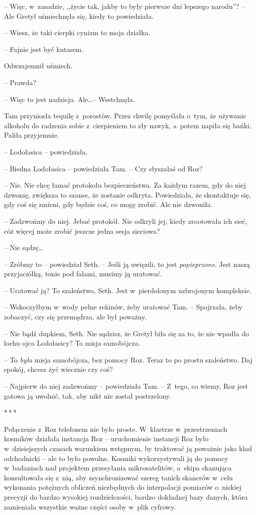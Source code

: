 \documentclass[oneside,polish,11pt,sfheadings]{mwbk}
\newcommand{\threeast}{\bigskip\par\centerline{*\,*\,*}\medskip\par}
\begin{document}
-- Więc, w~zasadzie, ,,życie tak, jakby to były pierwsze dni lepszego
narodu''? -- Ale Gretyl uśmiechnęła się, kiedy to powiedziała.

-- Wiesz, że taki cierpki cynizm to moja działka.

-- Fajnie jest być kutasem.

Odwzajemnił uśmiech. 

-- Prawda?

-- Więc to jest nadzieja. Ale\ldots  -- Westchnęła.

Tam przyniosła tequilę z~porostów. Przez chwilę pomyślała o~tym, że
używanie alkoholu do radzenia sobie z~cierpieniem to zły nawyk, a~potem
napiła się bańki. Paliła przyjemnie.

-- Lodołasica -- powiedziała.

-- Biedna Lodołasica -- powiedziała Tam. -- Czy słyszałaś od Roz?

-- Nie. Nie chcę łamać protokołu bezpieczeństwa. Za każdym razem, gdy do
niej dzwonię, zwiększa to szanse, że zostanie odkryta. Powiedziała, że
skontaktuje się, gdy coś się zmieni, gdy będzie coś, co mogę zrobić. Ale
nie dzwoniła.

-- Zadzwońmy do niej. Jebać protokół. Nie odkryli jej, kiedy zrootowała
ich sieć, cóż więcej może zrobić jeszcze jedna sesja sieciowa?

-- Nie sądzę\ldots 

-- Zróbmy to -- powiedział Seth. -- Jeśli ją uwięzili, to jest
\textit{popieprzone}. Jest naszą przyjaciółką, tonie pod falami, musimy ją
uratować.

-- Uratować ją? To szaleństwo, Seth. Jest w~pierdolonym uzbrojonym
kompleksie.

-- Wskoczyłbym w~wody pełne rekinów, żeby uratować Tam. -- Spojrzała, żeby
zobaczyć, czy się przemądrza, ale był poważny.

-- Nie bądź dupkiem, Seth. Nie sądzisz, że Gretyl biła się za to, że nie
wpadła do lochu ojca Lodołasicy? To misja samobójcza.

-- To \textit{była} misja samobójcza, bez pomocy Roz. Teraz to po prostu
szaleństwo. Daj spokój, chcesz żyć wiecznie czy coś?

-- Najpierw do niej zadzwońmy -- powiedziała Tam. -- Z~tego, co wiemy, Roz
jest gotowa ją uwolnić, tak, aby nikt nie został postrzelony.

\threeast

Połączenie z~Roz telefonem nie było proste. W~klastrze w~przestrzeniach
kosmików działała instancja Roz -- uruchomienie instancji Roz było w~dzisiejszych czasach warunkiem wstępnym, by traktować ją poważnie jako
klad odchodnicki -- ale to było powolne. Kosmiki wykorzystywali ją do
pomocy w~badaniach nad projektem przesyłania mikrosatelitów, a~ekipa
skanująca konsultowała się z~nią, aby zsynchronizować szereg tanich
skanerów w~celu wykonania potężnych obliczeń niezbędnych do interpolacji
pomiarów o~niskiej precyzji do bardzo wysokiej rozdzielczości, bardzo
dokładnej bazy danych, która zamieniała wszystkie ważne części osoby w~plik cyfrowy.
\end{document}

